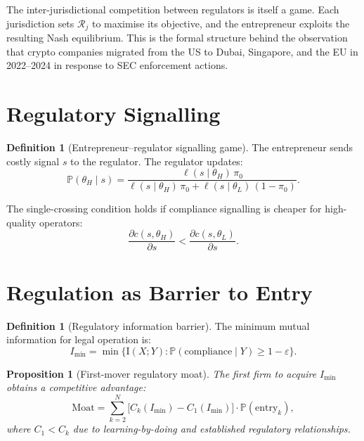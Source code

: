 \documentclass[12pt,a4paper,oneside]{book}
\newtheorem{proposition}[theorem]{Proposition}
\theoremstyle{definition}
\newtheorem{definition}[theorem]{Definition}
\theoremstyle{remark}
\newcommand{\Prob}{\mathbb{P}}
\newcommand{\MI}{\mathrm{I}}
\begin{document}
The inter-jurisdictional competition between regulators is itself a game. Each
jurisdiction sets $\mathcal{R}_j$ to maximise its objective, and the entrepreneur
exploits the resulting Nash equilibrium. This is the formal structure behind the
observation that crypto companies migrated from the US to Dubai, Singapore, and
the EU in 2022--2024 in response to SEC enforcement actions.

\section{Regulatory Signalling}

\begin{definition}[Entrepreneur--regulator signalling game]
The entrepreneur sends costly signal $s$ to the regulator. The regulator updates:
\begin{equation}\label{eq:reg_signal}
  \Prob(\theta_H \mid s) = \frac{\ell(s \mid \theta_H)\,\pi_0}
    {\ell(s \mid \theta_H)\,\pi_0
    + \ell(s \mid \theta_L)\,(1 - \pi_0)}.
\end{equation}
\end{definition}

The single-crossing condition holds if compliance signalling is cheaper for
high-quality operators:
\begin{equation}\label{eq:single_crossing_reg}
  \frac{\partial c(s, \theta_H)}{\partial s}
  < \frac{\partial c(s, \theta_L)}{\partial s}.
\end{equation}

\section{Regulation as Barrier to Entry}

\begin{definition}[Regulatory information barrier]
The minimum mutual information for legal operation is:
\begin{equation}\label{eq:i_min}
  I_{\min} = \min\bigl\{\MI(X; Y) :
    \Prob(\text{compliance} \mid Y) \geq 1 - \varepsilon\bigr\}.
\end{equation}
\end{definition}

\begin{proposition}[First-mover regulatory moat]\label{prop:moat}
The first firm to acquire $I_{\min}$ obtains a competitive advantage:
\begin{equation}\label{eq:moat_value}
  \text{Moat} = \sum_{k=2}^{N}
    \bigl[C_k(I_{\min}) - C_1(I_{\min})\bigr]
    \cdot \Prob(\text{entry}_k),
\end{equation}
where $C_1 < C_k$ due to learning-by-doing and established regulatory relationships.
\end{proposition}
\end{document}
